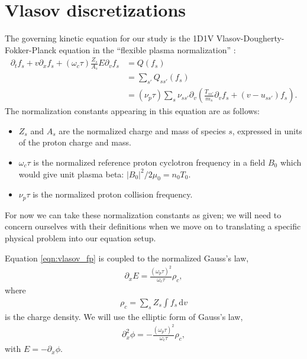 \documentclass{article}
\begin{document}
\section{Vlasov discretizations}

The governing kinetic equation for our study is the 1D1V Vlasov-Dougherty-Fokker-Planck equation in
the ``flexible plasma normalization'' \cite{millerMultispecies13momentModel2016}:
\begin{align}
    \label{eqn:vlasov_fp}
    \partial_t f_s + v \partial_x f_s + (\omega_c \tau) \frac{Z_s}{A_s} E \partial_v f_s &= Q(f_s) \\
                                                                                         &= \sum_{s'} Q_{s s'}(f_s)  \\
                                                                                         &= (\nu_p \tau) \sum_s \nu_{s s'} \partial_v \left( \frac{T_{s s'}}{m_s} \partial_v f_s + (v - u_{s s'}) f_s \right).
\end{align}
The normalization constants appearing in this equation are as follows:
\begin{itemize}
    \item $Z_s$ and $A_s$ are the normalized charge and mass of species $s$, expressed in units of the proton charge and mass.
    \item $\omega_c \tau$ is the normalized reference proton cyclotron frequency in a field $B_0$ which would give unit plasma beta: $|B_0|^2 / 2 \mu_0 = n_0 T_0$.
    \item $\nu_p \tau$ is the normalized proton collision frequency.
\end{itemize}
For now we can take these normalization constants as given; we will need to concern ourselves with their definitions when we
move on to translating a specific physical problem into our equation setup.

Equation \eqref{eqn:vlasov_fp} is coupled to the normalized Gauss's law,
\begin{align}
\partial_x E = \frac{(\omega_p \tau)^2}{\omega_c \tau} \rho_c,
\end{align}
where
\begin{align}
    \rho_c = \sum_s Z_s \int f_s \,\mathrm{d} v
\end{align}
is the charge density.
We will use the elliptic form of Gauss's law,
\begin{align}
\partial_x^2 \phi = -\frac{(\omega_p \tau)^2}{\omega_c \tau} \rho_c,
\end{align}
with $E = -\partial_x \phi$.
\end{document}
